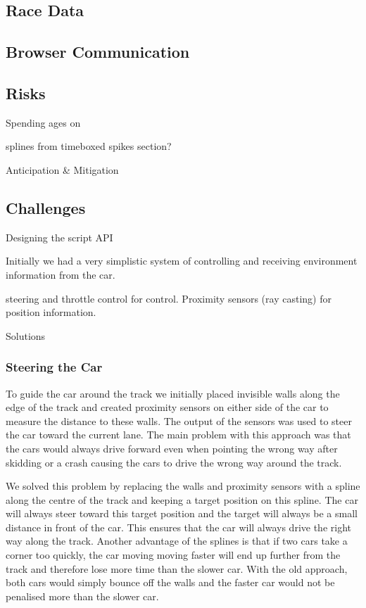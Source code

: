\subsection{Race Data}

\subsection{Browser Communication}

\subsection{Risks}
Spending ages on

splines from timeboxed spikes section?

Anticipation \& Mitigation

\subsection{Challenges}
Designing the script API

Initially we had a very simplistic system of controlling and receiving environment information from the car.

steering and throttle control for control. Proximity sensors (ray casting) for position information.

Solutions

\subsubsection{Steering the Car}
To guide the car around the track we initially placed invisible walls along the edge of the track and created proximity sensors on either side of the car to measure the distance to these walls. The output of the sensors was used to steer the car toward the current lane. The main problem with this approach was that the cars would always drive forward even when pointing the wrong way after skidding or a crash causing the cars to drive the wrong way around the track.

We solved this problem by replacing the walls and proximity sensors with a spline along the centre of the track and keeping a target position on this spline. The car will always steer toward this target position and the target will always be a small distance in front of the car. This ensures that the car will always drive the right way along the track. Another advantage of the splines is that if two cars take a corner too quickly, the car moving moving faster will end up further from the track and therefore lose more time than the slower car. With the old approach, both cars would simply bounce off the walls and the faster car would not be penalised more than the slower car.

